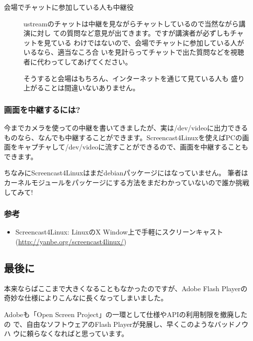 \documentclass[mingoth,a4paper]{jsarticle}
\begin{document}
\begin{description}
\item[会場でチャットに参加している人も中継役]

ustreamのチャットは中継を見ながらチャットしているので当然ながら講演に対し
ての質問など意見が出てきます。ですが講演者が必ずしもチャットを見ている
わけではないので、会場でチャットに参加している人がいるなら、適当なころ合
いを見計らってチャットで出た質問などを視聴者に代わってしてあげてください。

そうすると会場はもちろん、インターネットを通じて見ている人も
盛り上がることは間違いないありません。

\end{description}

\subsubsection{画面を中継するには?}

今までカメラを使っての中継を書いてきましたが、実は/dev/videoに出力できる
ものなら、なんでも中継することができます。Screencast4Linuxを使えばPCの画
面をキャプチャして/dev/videoに流すことができるので、画面を中継することも
できます。

ちなみにScreencast4Linuxはまだdebianパッケージにはなっていません。
筆者はカーネルモジュールをパッケージにする方法をまだわかっていないので誰か挑戦してみて!

\subsubsection{参考}

\begin{itemize}
 \item Screencast4Linux: LinuxのX Window上で手軽にスクリーンキャスト \\
            (\url{http://yanbe.org/screencast4linux/})
\end{itemize}

\subsection{最後に}

本来ならばここまで大きくなることもなかったのですが、Adobe Flash Playerの
奇妙な仕様によりこんなに長くなってしまいました。

Adobeも「Open Screen Project」の一環として仕様やAPIの利用制限を撤廃したの
で、自由なソフトウェアのFlash Playerが発展し、早くこのようなバッドノウハ
ウに頼らなくなればと思っています。
\end{document}
